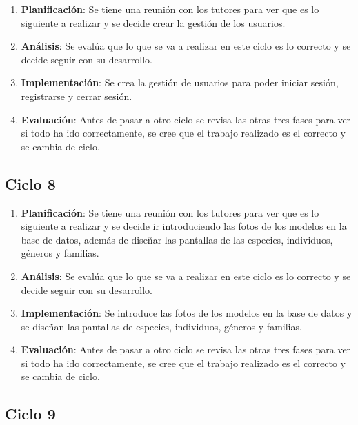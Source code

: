 \begin{enumerate}
	\item \textbf{Planificación}: Se tiene una reunión con los tutores para ver que es lo siguiente a realizar y se decide crear la gestión de los usuarios.
	\item \textbf{Análisis}: Se evalúa que lo que se va a realizar en este ciclo es lo correcto y se decide seguir con su desarrollo.
	\item \textbf{Implementación}: Se crea la gestión de usuarios para poder iniciar sesión, registrarse y cerrar sesión.
	\item \textbf{Evaluación}: Antes de pasar a otro ciclo se revisa las otras tres fases para ver si todo ha ido correctamente, se cree que el trabajo realizado es el correcto y se cambia de ciclo.
\end{enumerate}

\subsection{Ciclo 8}

\begin{enumerate}
	\item \textbf{Planificación}: Se tiene una reunión con los tutores para ver que es lo siguiente a realizar y se decide ir introduciendo las fotos de los modelos en la base de datos, además de diseñar las pantallas de las especies, individuos, géneros y familias.
	\item \textbf{Análisis}: Se evalúa que lo que se va a realizar en este ciclo es lo correcto y se decide seguir con su desarrollo.
	\item \textbf{Implementación}: Se introduce las fotos de los modelos en la base de datos y se diseñan las pantallas de especies, individuos, géneros y familias.
	\item \textbf{Evaluación}: Antes de pasar a otro ciclo se revisa las otras tres fases para ver si todo ha ido correctamente, se cree que el trabajo realizado es el correcto y se cambia de ciclo.
\end{enumerate}

\subsection{Ciclo 9}

